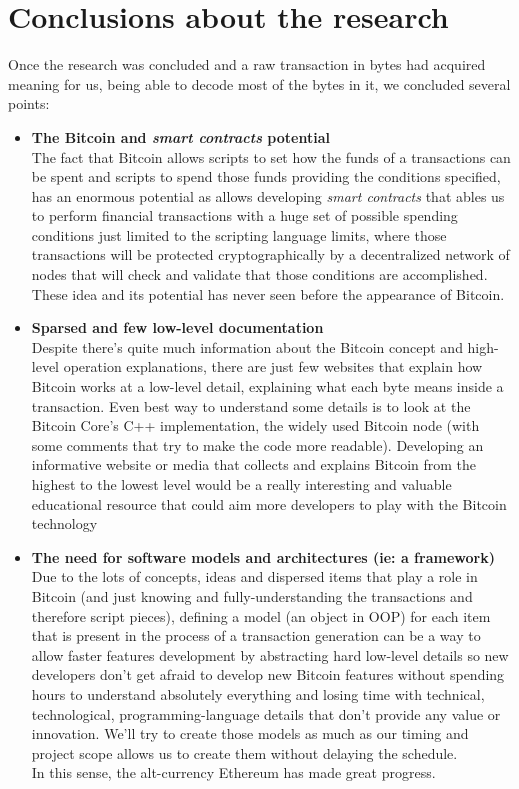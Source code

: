 \section{Conclusions about the research}
Once the research was concluded and a raw transaction in bytes had acquired meaning for us, being able to decode most of the bytes in it, we concluded several points:
\begin{itemize}
    \item \textbf{The Bitcoin and \textit{smart contracts} potential}\\
    The fact that Bitcoin allows scripts to set how the funds of a transactions can be spent and scripts to spend those funds providing the conditions specified, has an enormous potential as allows developing \textit{smart contracts} that ables us to perform financial transactions with a huge set of possible spending conditions just limited to the scripting language limits, where those transactions will be protected cryptographically by a decentralized network of nodes that will check and validate that those conditions are accomplished. These idea and its potential has never seen before the appearance of Bitcoin.
    \item \textbf{Sparsed and few low-level documentation}\\ Despite there's quite much information about the Bitcoin concept and high-level operation explanations, there are just few websites that explain how Bitcoin works at a low-level detail, explaining what each byte means inside a transaction. Even best way to understand some details is to look at the Bitcoin Core's C++ implementation\cite{bitcoin_github:online}, the widely used Bitcoin node (with some comments that try to make the code more readable). Developing an informative website or media that collects and explains Bitcoin from the highest to the lowest level would be a really interesting and valuable educational resource that could aim more developers to play with the Bitcoin technology
    \item \textbf{The need for software models and architectures (ie: a framework)}\\ Due to the lots of concepts, ideas and dispersed items that play a role in Bitcoin (and just knowing and fully-understanding the transactions and therefore script pieces), defining a model (an object in OOP) for each item that is present in the process of a transaction generation can be a way to allow faster features development by abstracting hard low-level details so new developers don't get afraid to develop new Bitcoin features without spending hours to understand absolutely everything and losing time with technical, technological, programming-language details that don't provide any value or innovation. We'll try to create those models as much as our timing and project scope allows us to create them without delaying the schedule.\\ In this sense, the alt-currency Ethereum\cite{ethereum:online} has made great progress.
\end{itemize}
